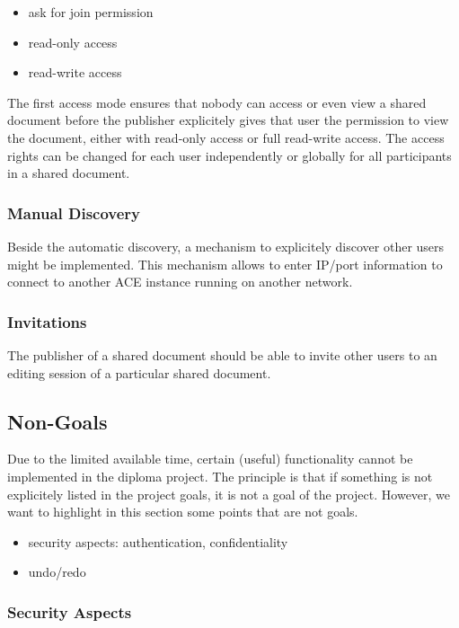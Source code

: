 \documentclass[11pt,a4paper]{article}
\begin{document}
\begin{itemize}
 \item ask for join permission
 \item read-only access
 \item read-write access
\end{itemize}

The first access mode ensures that nobody can access or even view a shared document before the publisher explicitely gives
that user the permission to view the document, either with read-only access or full read-write access. The access rights
can be changed for each user independently or globally for all participants in a shared document.

\subsubsection{Manual Discovery}

Beside the automatic discovery, a mechanism to explicitely discover other users might be implemented. This
mechanism allows to enter IP/port information to connect to another ACE instance running on another
network.

\subsubsection{Invitations}

The publisher of a shared document should be able to invite other users to an editing session of a particular shared
document.


\subsection{Non-Goals}

Due to the limited available time, certain (useful) functionality cannot be implemented in the diploma project. The 
principle is that if something is not explicitely listed in the project goals, it is not a goal of the project. However,
we want to highlight in this section some points that are not goals.

\begin{itemize}
 \item security aspects: authentication, confidentiality
 \item undo/redo
\end{itemize}

\subsubsection{Security Aspects}
\end{document}
